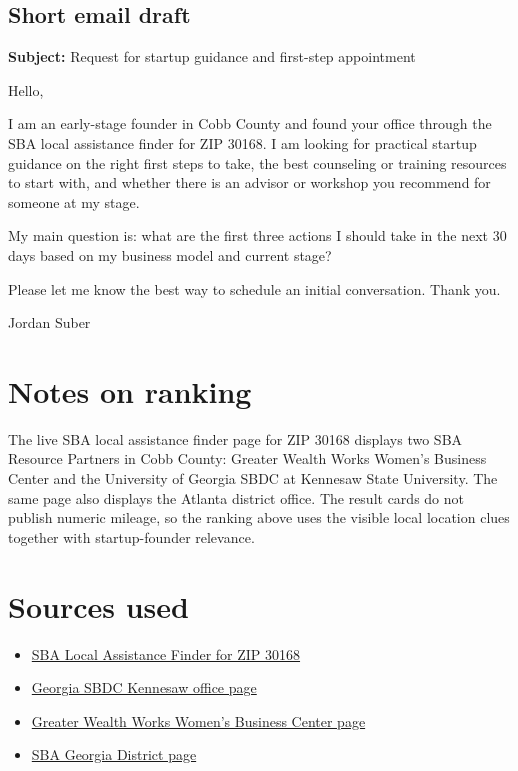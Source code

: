 \documentclass[11pt]{article}
\begin{document}
\subsection*{Short email draft}
\textbf{Subject:} Request for startup guidance and first-step appointment

Hello,

I am an early-stage founder in Cobb County and found your office through the SBA local assistance finder for ZIP 30168. I am looking for practical startup guidance on the right first steps to take, the best counseling or training resources to start with, and whether there is an advisor or workshop you recommend for someone at my stage.

My main question is: what are the first three actions I should take in the next 30 days based on my business model and current stage?

Please let me know the best way to schedule an initial conversation. Thank you.

Jordan Suber

\section*{Notes on ranking}
The live SBA local assistance finder page for ZIP 30168 displays two SBA Resource Partners in Cobb County: Greater Wealth Works Women's Business Center and the University of Georgia SBDC at Kennesaw State University. The same page also displays the Atlanta district office. The result cards do not publish numeric mileage, so the ranking above uses the visible local location clues together with startup-founder relevance.

\section*{Sources used}
\begin{itemize}[leftmargin=1.25em]
\item \href{https://www.sba.gov/local-assistance/find?zip=30168&type=All}{SBA Local Assistance Finder for ZIP 30168}
\item \href{https://georgiasbdc.org/locations/kennesaw-office/}{Georgia SBDC Kennesaw office page}
\item \href{https://greaterwealthworks.org/wbc/}{Greater Wealth Works Women's Business Center page}
\item \href{https://www.sba.gov/district/georgia}{SBA Georgia District page}
\end{itemize}
\end{document}
